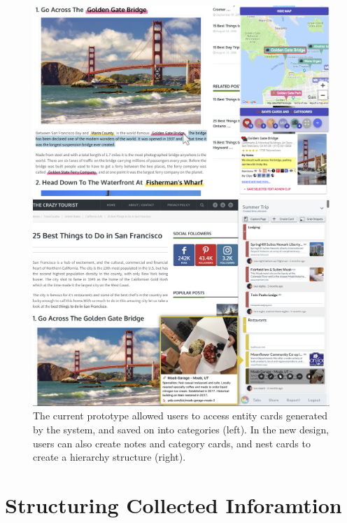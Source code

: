 \begin{figure}
\centering
\begin{minipage}{.49\textwidth}
  \centering
  \includegraphics[width=\textwidth]{Chapters/Fusion/main.png}
\end{minipage}%
\begin{minipage}{.49\textwidth}
  \centering
  \includegraphics[width=\textwidth]{images/fuse.png}
\end{minipage}
\caption{The current prototype allowed users to access entity cards generated by the system, and saved on into categories (left). In the new design, users can also create notes and category cards, and nest cards to create a hierarchy structure (right).}
\label{fig:test2}
\end{figure}

\section{Structuring Collected Inforamtion}

